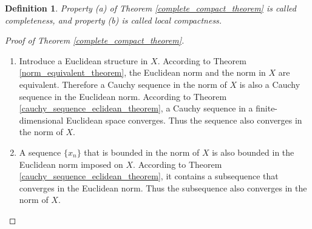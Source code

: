 \documentclass[10pt]{book}
\newtheorem{definition}{Definition}[chapter]
\theoremstyle{definition}
\numberwithin{equation}{chapter}
\begin{document}
\begin{definition}
Property (a) of Theorem \ref{complete_compact_theorem} is called completeness, and property (b) is called local compactness.
\end{definition}

\medskip

\begin{proof}[Proof of Theorem \ref{complete_compact_theorem}]
~\begin{enumerate}[label=(\alph*)]
    \item Introduce a Euclidean structure in $X$. According to Theorem \ref{norm_equivalent_theorem}, the Euclidean norm and the norm in $X$ are equivalent. Therefore a Cauchy sequence in the norm of $X$ is also a Cauchy sequence in the Euclidean norm.  According to Theorem \ref{cauchy_sequence_eclidean_theorem}, a Cauchy sequence in a finite-dimensional Euclidean space converges. Thus the sequence also converges in the norm of $X$.
    
    \item A sequence $\{x_n\}$ that is bounded in the norm of $X$ is also bounded in the Euclidean norm imposed on $X$. According to Theorem \ref{cauchy_sequence_eclidean_theorem}, it contains a subsequence that converges in the Euclidean norm. Thus the subsequence also converges in the norm of $X$.
\end{enumerate}
\end{proof}

\medskip
\end{document}

